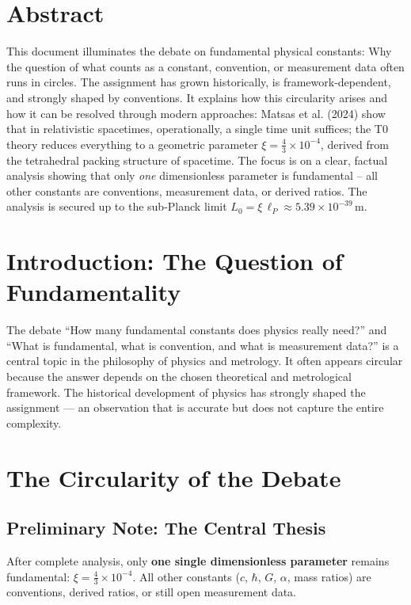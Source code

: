 \section*{Abstract}
		This document illuminates the debate on fundamental physical constants: Why the question of what counts as a constant, convention, or measurement data often runs in circles. The assignment has grown historically, is framework-dependent, and strongly shaped by conventions. It explains how this circularity arises and how it can be resolved through modern approaches: Matsas et al. (2024) show that in relativistic spacetimes, operationally, a single time unit suffices; the T0 theory reduces everything to a geometric parameter $\xi = \frac{4}{3} \times 10^{-4}$, derived from the tetrahedral packing structure of spacetime. The focus is on a clear, factual analysis showing that only \emph{one} dimensionless parameter is fundamental -- all other constants are conventions, measurement data, or derived ratios. The analysis is secured up to the sub-Planck limit $L_0 = \xi \, \ell_P \approx 5.39 \times 10^{-39}\,\text{m}$.


	
	\section{Introduction: The Question of Fundamentality}
	The debate ``How many fundamental constants does physics really need?'' and ``What is fundamental, what is convention, and what is measurement data?'' is a central topic in the philosophy of physics and metrology. It often appears circular because the answer depends on the chosen theoretical and metrological framework. The historical development of physics has strongly shaped the assignment --- an observation that is accurate but does not capture the entire complexity.
	
	\section{The Circularity of the Debate}
	
	\subsection{Preliminary Note: The Central Thesis}
	After complete analysis, only \textbf{one single dimensionless parameter} remains fundamental: $\xi = \frac{4}{3} \times 10^{-4}$. All other constants ($c$, $\hbar$, $G$, $\alpha$, mass ratios) are conventions, derived ratios, or still open measurement data.
	
